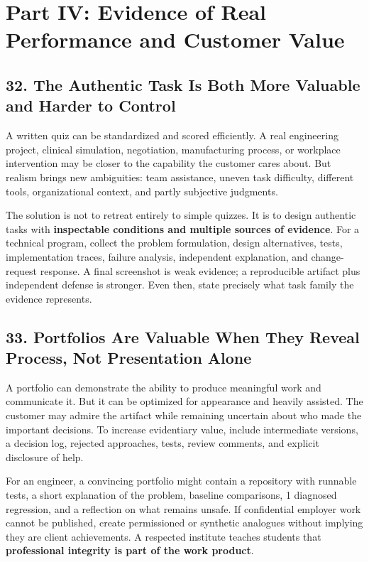 \section*{Part IV: Evidence of Real Performance and Customer Value}

\subsection*{32. The Authentic Task Is Both More Valuable and Harder to Control}

A written quiz can be standardized and scored efficiently. A real engineering project, clinical simulation, negotiation, manufacturing process, or workplace intervention may be closer to the capability the customer cares about. But realism brings new ambiguities: team assistance, uneven task difficulty, different tools, organizational context, and partly subjective judgments.

The solution is not to retreat entirely to simple quizzes. It is to design authentic tasks with \textbf{inspectable conditions and multiple sources of evidence}. For a technical program, collect the problem formulation, design alternatives, tests, implementation traces, failure analysis, independent explanation, and change-request response. A final screenshot is weak evidence; a reproducible artifact plus independent defense is stronger. Even then, state precisely what task family the evidence represents.

\subsection*{33. Portfolios Are Valuable When They Reveal Process, Not Presentation Alone}

A portfolio can demonstrate the ability to produce meaningful work and communicate it. But it can be optimized for appearance and heavily assisted. The customer may admire the artifact while remaining uncertain about who made the important decisions. To increase evidentiary value, include intermediate versions, a decision log, rejected approaches, tests, review comments, and explicit disclosure of help.

For an engineer, a convincing portfolio might contain a repository with runnable tests, a short explanation of the problem, baseline comparisons, 1 diagnosed regression, and a reflection on what remains unsafe. If confidential employer work cannot be published, create permissioned or synthetic analogues without implying they are client achievements. A respected institute teaches students that \textbf{professional integrity is part of the work product}.

